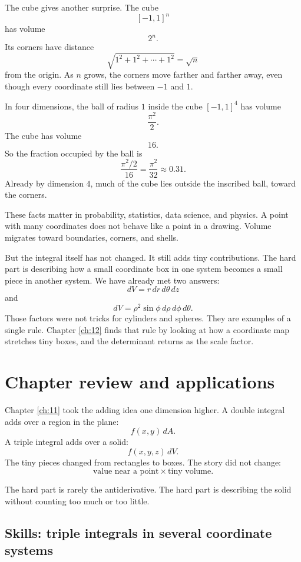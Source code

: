 The cube gives another surprise.  The cube
\[
    [-1,1]^n
\]
has volume
\[
    2^n.
\]
Its corners have distance
\[
    \sqrt{1^2+1^2+\cdots+1^2}=\sqrt n
\]
from the origin.  As \(n\) grows, the corners move farther and farther away, even
though every coordinate still lies between \(-1\) and \(1\).

In four dimensions, the ball of radius \(1\) inside the cube \([-1,1]^4\) has volume
\[
    \frac{\pi^2}{2}.
\]
The cube has volume
\[
    16.
\]
So the fraction occupied by the ball is
\[
    \frac{\pi^2/2}{16}
    =
    \frac{\pi^2}{32}
    \approx 0.31.
\]
Already by dimension \(4\), much of the cube lies outside the inscribed ball, toward
the corners.

These facts matter in probability, statistics, data science, and physics.  A point with
many coordinates does not behave like a point in a drawing.  Volume migrates toward
boundaries, corners, and shells.

But the integral itself has not changed.  It still adds tiny contributions.  The hard
part is describing how a small coordinate box in one system becomes a small piece in
another system.  We have already met two answers:
\[
    dV=r\,dr\,d\theta\,dz
\]
and
\[
    dV=\rho^2\sin\phi\,d\rho\,d\phi\,d\theta.
\]
Those factors were not tricks for cylinders and spheres.  They are examples of a
single rule.  Chapter \ref{ch:12} finds that rule by looking at how a coordinate map
stretches tiny boxes, and the determinant returns as the scale factor.
\section{Chapter review and applications}
\label{sec:11.7}

Chapter \ref{ch:11} took the adding idea one dimension higher.  A double integral
adds over a region in the plane:
\[
    f(x,y)\,dA.
\]
A triple integral adds over a solid:
\[
    f(x,y,z)\,dV.
\]
The tiny pieces changed from rectangles to boxes.  The story did not change:
\[
    \text{value near a point}\times \text{tiny volume}.
\]

The hard part is rarely the antiderivative.  The hard part is describing the solid without
counting too much or too little.

\subsection{Skills: triple integrals in several coordinate systems}

